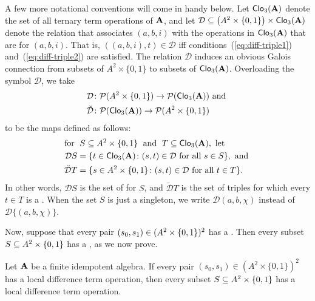 \documentclass{ws-ijac}
\begin{document}

\newcommand\dtrel{\ensuremath{\mathrel{\mathcal{D}}}}
\newcommand\dtr{\ensuremath{\mathcal{D}}}
A few more notational conventions will come in handy below.
Let $\operatorname{\mathsf{Clo}}_3(\mathbf{A})$ denote the set of all ternary term operations of $\mathbf{A}$,
and let
$\dtr \subseteq \bigl(A^2\times \{0,1\}\bigr) \times \Clo_3(\alg{A})$
denote the relation that associates $(a, b, i)$
with the operations in $\operatorname{\mathsf{Clo}}_3(\mathbf{A})$ that are \ldtos for
$(a, b, i)$.  That is,
$((a,b,i), t) \in \dtr$ iff conditions~(\ref{eq:diff-triple1})
and~(\ref{eq:diff-triple2}) are satisfied.
The relation $\dtr$ induces an obvious Galois connection
from subsets of $A^2\times \{0,1\}$ to subsets
of $\operatorname{\mathsf{Clo}}_3(\mathbf{A})$.  Overloading the symbol $\dtr$,
we take
\begin{align*}
\dtr &\colon \sP(A^2 \times \{0,1\}) \to \sP(\Clo_3(\alg{A})) \text{ and }\\
\breve{\dtr} &\colon \sP(\Clo_3(\alg{A})) \to \sP(A^2\times \{0,1\})
\end{align*}
to be the maps defined as follows:
\begin{align*}
  \text{for }& \;  S \subseteq A^2 \times \{0,1\}\; \text{ and } \;T \subseteq \Clo_3(\alg{A}),
  \text{ let }\\
  \dtr S &= \{t \in \Clo_3(\alg{A}) \colon (s,t) \in \dtr \text{ for all } s \in S\}, \text{ and }\\
  \breve{\dtr} T &= \{s \in A^2 \times \{0,1\} \colon (s,t) \in \dtr \text{ for all } t \in T\}.
\end{align*}
In other words, $\dtr S$ is the set of \ldtos
for $S$, and $\breve{\dtr} T$ is the set of triples for which every $t\in T$
is a \ldto.  When the set $S$ is just a singleton, we write
$\dtr (a,b,\chi)$ instead of $\dtr \{(a,b,\chi)\}$.

Now, suppose that every pair
$(s_0, s_1)\in (A^2 \times \{0,1\})^2$ %
has a \ldto.
Then every subset $S\subseteq A^2 \times \{0,1\}$
has a \ldto, as we now prove.

\begin{theorem} %
  \label{thm:local-diff-terms}
  Let
  $\mathbf{A}$ be a finite idempotent algebra. %
  If every pair
  $(s_0, s_1) \in (A^2 \times \{0,1\})^2$
  has a local difference term operation, then
  every subset $S \subseteq A^2 \times \{0,1\}$
  has a local difference term operation.
\end{theorem}
\end{document}

